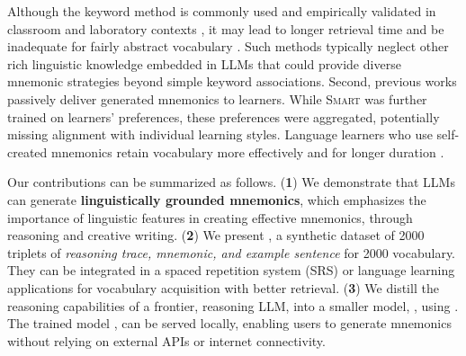 Although the keyword method is commonly used and empirically validated in classroom and laboratory contexts \citetext{\citealp{atkinsonApplicationMnemonicKeyword1975}, \citealp{pressleyMnemonicKeywordMethod1982}}, it may lead to longer retrieval time \citep{vanhellKeywordMnemonicsRote1997} and be inadequate for fairly abstract vocabulary \citetext{\citealp{camposLimitationsMnemonicKeywordMethod2003}, \citealp{camposImportanceKeywordGenerationMethod2004a}}. Such methods typically neglect other rich linguistic knowledge embedded in LLMs that could provide diverse mnemonic strategies beyond simple keyword associations. Second, previous works passively deliver generated mnemonics to learners. While \textsc{Smart} \citep{balepurSMART2024} was further trained on learners' preferences, these preferences were aggregated, potentially missing alignment with individual learning styles. Language learners who use self-created mnemonics retain vocabulary more effectively and for longer duration \citep{madanExploringWordMemorability2021}.

Our contributions can be summarized as follows. (\textbf{1}) We demonstrate that LLMs can generate \textbf{linguistically grounded mnemonics}, which emphasizes the importance of linguistic features in creating effective mnemonics, through reasoning and creative writing. (\textbf{2}) We present \links, a synthetic dataset of 2000 triplets of \textit{reasoning trace, mnemonic, and example sentence} for 2000 vocabulary. They can be integrated in a spaced repetition system (SRS) or language learning applications for vocabulary acquisition with better retrieval. (\textbf{3}) We distill the reasoning capabilities of a frontier, reasoning LLM, into a smaller model, \studentmodel, using \citep{DeepSeek-AIDEEPSEEKR12025}. The trained model \links, can be served locally, enabling users to generate mnemonics without relying on external APIs or internet connectivity.
